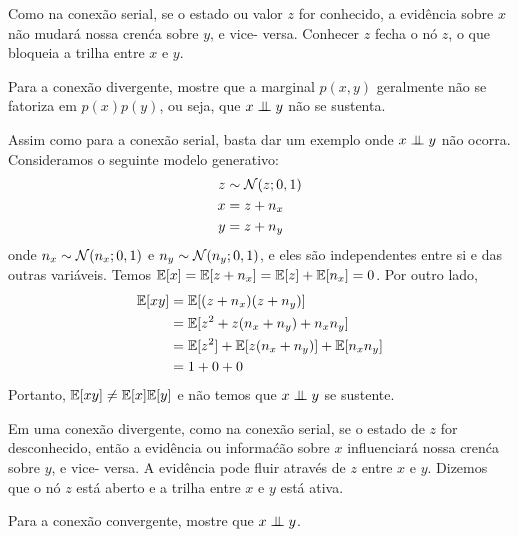 \begin{exenumerate}
\begin{solution}
        Como na conex\~ao serial, se o estado ou valor $z$ for conhecido,
        a evid\^encia sobre $x$ n\~ao mudar\'a nossa cren\'ca sobre $y$, e vice-
        versa. Conhecer $z$ fecha o n\'o $z$, o que bloqueia a trilha
        entre $x$ e $y$.
    \end{solution}
    
    \item Para a conex\~ao divergente, mostre que a marginal $p(x,y)$
    geralmente n\~ao se fatoriza em $p(x)p(y)$, ou seja, que $x \mathrel{\perp\mspace{-10mu}\perp} y$ n\~ao se
    sustenta.
    
    \begin{solution}
        Assim como para a conex\~ao serial, basta dar um exemplo
        onde $x \mathrel{\perp\mspace{-10mu}\perp} y$ n\~ao ocorra. Consideramos o seguinte
        modelo generativo:
        \begin{align}
            z & \sim \mathcal{N}(z; 0, 1)\\
            x &= z + n_x\\
            y &= z + n_y
        \end{align}
        onde $n_x \sim \mathcal{N}(n_x; 0, 1)$ e $n_y \sim \mathcal{N}(n_y; 0,
        1)$, e eles s\~ao independentes entre si e das outras
        vari\'aveis. Temos $\mathbb{E}[x] = \mathbb{E}[z + n_x] = \mathbb{E}[z]+\mathbb{E}[n_x]=0$. Por
        outro lado,
        \begin{align}
            \mathbb{E}[x y] & = \mathbb{E}[(z + n_x)( z + n_y)]\\
            & = \mathbb{E}[z^2 + z(n_x+n_y) + n_xn_y]\\
            & = \mathbb{E}[z^2] +  \mathbb{E}[z(n_x+n_y)] +  \mathbb{E}[n_xn_y]\\
            & = 1 + 0 + 0
        \end{align}
        Portanto, $\mathbb{E}[xy] \neq \mathbb{E}[x]\mathbb{E}[y]$ e n\~ao temos que $x
        \mathrel{\perp\mspace{-10mu}\perp} y$ se sustente.
        
        Em uma conex\~ao divergente, como na conex\~ao serial, se
        o estado de $z$ for desconhecido, ent\~ao a evid\^encia ou informa\'c\~ao sobre
        $x$ influenciar\'a nossa cren\'ca sobre $y$, e vice-
        versa. A evid\^encia pode fluir atrav\'es de $z$ entre $x$ e $y$. Dizemos
        que o n\'o $z$ est\'a aberto e a trilha entre $x$ e $y$ est\'a
        ativa.
    \end{solution}
    
    \item Para a conex\~ao convergente, mostre que $x \mathrel{\perp\mspace{-10mu}\perp} y$.
    

\end{exenumerate}
